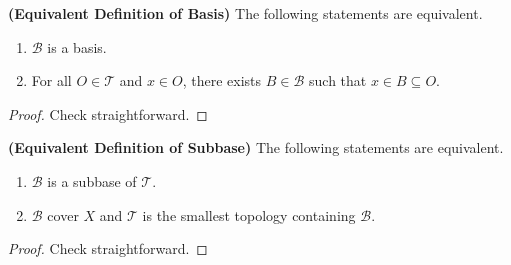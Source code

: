 \documentclass{report}
\begin{document}
\begin{theorem}
  \textbf{(Equivalent Definition of Basis)} The following statements are equivalent.
\begin{enumerate}[label=(\alph*)]
  \item $\mathcal{B}$ is a basis.
  \item For all $O\in \mathscr{T }$ and $x\in O$, there exists $B \in \mathcal{B}$ such that $x \in B \subseteq O$.
\end{enumerate}
\end{theorem}
\begin{proof}
Check straightforward.
\end{proof}
\begin{theorem}
\textbf{(Equivalent Definition of Subbase)} The following statements are equivalent. 
\begin{enumerate}[label=(\alph*)]
  \item $\mathcal{B}$ is a subbase of $\mathscr{T }$. 
  \item $\mathcal{B}$ cover $X$ and $\mathscr{T }$ is the smallest topology containing $\mathcal{B}$. 
\end{enumerate}
\end{theorem}
\begin{proof}
Check straightforward. 
\end{proof}
\end{document}
